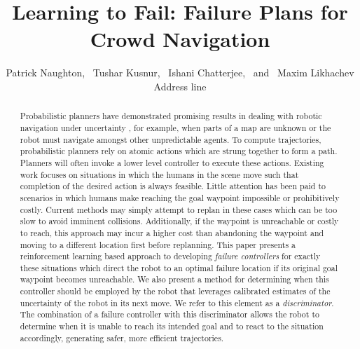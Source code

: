 \documentclass[letterpaper]{article}
\title{Learning to Fail: Failure Plans for Crowd Navigation}
\author{Patrick Naughton, \ Tushar Kusnur, \ Ishani Chatterjee, \ and \ Maxim Likhachev\\
Address line\\
}
\begin{document}
	
	\maketitle
	
	\begin{abstract}
		Probabilistic planners have demonstrated promising results in dealing with robotic navigation under uncertainty \cite{ppcp}, for example, when parts of a map are unknown or the robot must navigate amongst other unpredictable agents. To compute trajectories, probabilistic planners rely on atomic actions which are strung together to form a path. Planners will often invoke a lower level controller to execute these actions. Existing work focuses on situations in which the humans in the scene move such that completion of the desired action is always feasible. Little attention has been paid to scenarios in which humans make reaching the goal waypoint impossible or prohibitively costly. Current methods may simply attempt to replan in these cases which can be too slow to avoid imminent collisions. Additionally, if the waypoint is unreachable or costly to reach, this approach may incur a higher cost than abandoning the waypoint and moving to a different location first before replanning. This paper presents a reinforcement learning based approach to developing \textit{failure controllers} for exactly these situations which direct the robot to an optimal failure location if its original goal waypoint becomes unreachable. We also present a method for determining when this controller should be employed by the robot that leverages calibrated estimates of the uncertainty of the robot in its next move. We refer to this element as a \textit{discriminator}. The combination of a failure controller with this discriminator allows the robot to determine when it is unable to reach its intended goal and to react to the situation accordingly, generating safer, more efficient trajectories.
	\end{abstract}
	
\end{document}
